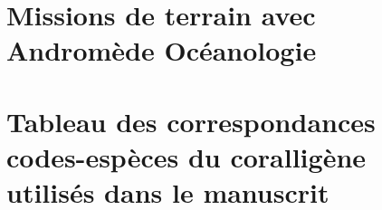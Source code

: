 \documentclass[11pt,a4paper]{book} %
\begin{document}
\begin{appendices}
    \chapter{Missions de terrain avec Andromède Océanologie} 
    \label{annexe-terrain}
    
    
    \chapter[Tableau des correspondances codes-espèces du coralligène]{Tableau des correspondances codes-espèces du coralligène utilisés dans le manuscrit}
    \label{annexe-species}
    

\end{appendices}

\pagestyle{abstract}
\backmatter %

\end{document}
